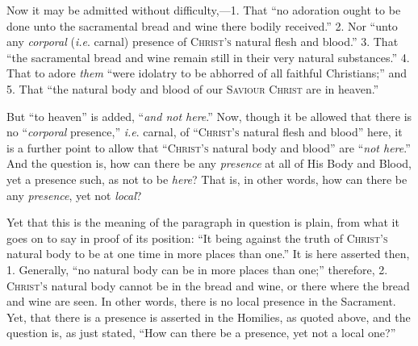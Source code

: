 Now it may be admitted without difficulty,—1. That ``no
adoration ought to be done unto the sacramental bread and wine there
bodily received.'' 2. Nor ``unto any \emph{corporal} (\emph{i.e}.
carnal) presence of C\textsc{hrist's} natural flesh and blood.'' 3. That
``the sacramental bread and wine remain still in their very
natural substances.'' 4. That to adore \emph{them} ``were
idolatry to be abhorred of all faithful Christians;'' and 5. That
``the natural body and blood of our S\textsc{aviour}
C\textsc{hrist} are in heaven.''

But ``to heaven'' is added, ``\emph{and not here}.''
Now, though it be allowed that there is no ``\emph{corporal}
presence,'' \emph{i.e}. carnal, of ``C\textsc{hrist's}
natural flesh and blood'' here, it is a further point to
allow that ``C\textsc{hrist's} natural body and
blood'' are ``\emph{not here}.'' And the question is, how
can there be any \emph{presence} at all of His Body and Blood, yet a
presence such, as not to be \emph{here}? That is, in other words, how
can there be any \emph{presence}, yet not \emph{local}?

Yet that this is the meaning of the paragraph in question is plain,
from what it goes on to say in proof of its position: ``It being
against the truth of C\textsc{hrist's} natural body to be
at one time in more places than one.'' It is here asserted then,
1. Generally, ``no natural body can be in more places than
one;'' therefore, 2. C\textsc{hrist's} natural body
cannot be in the bread and wine, or there where the bread and wine are
seen. In other words, there is no local presence in the Sacrament.
Yet, that there is a presence is asserted in the Homilies, as quoted
above, and the question is, as just stated, ``How can there be a
presence, yet not a local one?''

